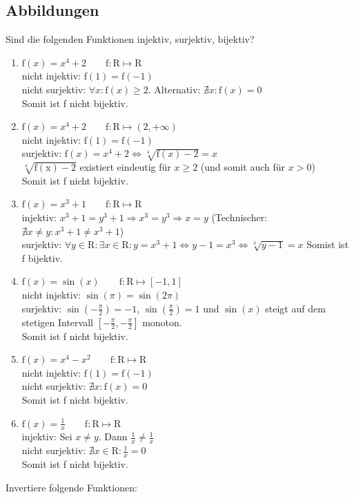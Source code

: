 \documentclass[11pt, a4paper]{article}
\begin{document}
\subsection{Abbildungen}
Sind die folgenden Funktionen injektiv, surjektiv, bijektiv?
\begin{enumerate}
	\item $\mathrm{f}(x) = x^4+2 \qquad \mathrm{f}: \mathrm{R} \mapsto \mathrm{R}$ \\
	nicht injektiv: $\mathrm{f}(1) = \mathrm{f}(-1)$ \\
	nicht surjektiv: $\forall x: \mathrm{f}(x) \geq 2$. Alternativ: $\nexists x: \mathrm{f}(x) = 0$ \\
	Somit ist f nicht bijektiv.
	\item $\mathrm{f}(x) = x^4+2 \qquad \mathrm{f}: \mathrm{R} \mapsto (2, + \infty)$ \\
	nicht injektiv: $\mathrm{f}(1) = \mathrm{f}(-1)$ \\
	surjektiv: $\mathrm{f}(x) = x^4 + 2 \Leftrightarrow \sqrt[4]{\mathrm{f}(x) - 2} = x$ \\
	$\sqrt[4]{\mathrm{f(x)}-2}$ existiert eindeutig für $x \geq 2$ (und somit auch für $x > 0$) \\
	Somit ist f nicht bijektiv.
	\item $\mathrm{f}(x) = x^3+1 \qquad \mathrm{f}: \mathrm{R} \mapsto \mathrm{R}$ \\
	injektiv: $x^3 + 1 = y^3 + 1 \Rightarrow x^3 = y^3 \Rightarrow x = y$ (Technischer: $\nexists x \neq y: x^3 + 1 \neq x^3 + 1$) \\
	surjektiv: $\forall y \in \mathrm{R}: \exists x \in \mathrm{R}: y = x^3 + 1 \Leftrightarrow y - 1 = x^3 \Leftrightarrow \sqrt[3]{y-1} = x$
	Somist ist f bijektiv.
	\item $\mathrm{f}(x) = \sin(x) \qquad \mathrm{f}: \mathrm{R} \mapsto [-1, 1]$ \\
	nicht injektiv: $\sin(\pi) = \sin(2 \pi)$ \\
	surjektiv: $\sin\left(-\frac{\pi}{2}\right) = -1$, $\sin\left(\frac{\pi}{2}\right) = 1$ und $\sin(x)$ steigt auf dem stetigen Intervall $\left[-\frac{\pi}{2},-\frac{\pi}{2}\right]$ monoton. \\
	Somit ist f nicht bijektiv.
	\item $\mathrm{f}(x) = x^4 - x^2 \qquad \mathrm{f}: \mathrm{R} \mapsto \mathrm{R}$ \\
	nicht injektiv: $\mathrm{f}(1) = \mathrm{f}(-1)$ \\
	nicht surjektiv: $\nexists x: \mathrm{f}(x) = 0$ \\
	Somit ist f nicht bijektiv.
	\item $\mathrm{f}(x) = \frac{1}{x} \qquad \mathrm{f}: \mathrm{R} \mapsto \mathrm{R}$ \\
	injektiv: Sei $x \neq y$. Dann $\frac{1}{x} \neq \frac{1}{x}$ \\
	nicht surjektiv: $\nexists x \in \mathrm{R}: \frac{1}{x} = 0$ \\
	Somit ist f nicht bijektiv.
\end{enumerate}
Invertiere folgende Funktionen:
\end{document}
